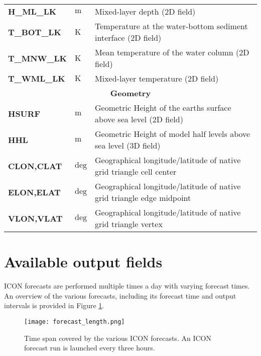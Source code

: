 \begin{longtable}{p{2.5cm}p{1.8cm}p{10.0cm}}
\textbf{H\_ML\_LK}                      &  $\mathrm{m}$               &  Mixed-layer depth (2D field)\\
\textbf{T\_BOT\_LK}                     &  $\mathrm{K}$               &  Temperature at the water-bottom sediment interface (2D field)\\
\textbf{T\_MNW\_LK}                     &  $\mathrm{K}$               &  Mean temperature of the water column (2D field)\\
\textbf{T\_WML\_LK}                     &  $\mathrm{K}$               &  Mixed-layer temperature (2D field)\\
\midrule
\multicolumn{3}{c}{\textbf{Geometry}}\\
\midrule
\textbf{HSURF}                          &  $\mathrm{m}$               &  Geometric Height of the earths surface above sea level (2D field) \\
\textbf{HHL}                            &  $\mathrm{m}$               &  Geometric Height of model half levels above sea level (3D field) \\
\textbf{CLON,CLAT}                      &  $\mathrm{deg}$             &  Geographical longitude/latitude of native grid triangle cell center \\
\textbf{ELON,ELAT}                      &  $\mathrm{deg}$             &  Geographical longitude/latitude of native grid triangle edge midpoint \\
\textbf{VLON,VLAT}                      &  $\mathrm{deg}$             &  Geographical longitude/latitude of native grid triangle vertex \\
  \bottomrule
\end{longtable}





\section{Available output fields}\label{sec_outfields}

ICON forecasts are performed multiple times a day with varying forecast times. An overview of the various forecasts, including its  
forecast time and output intervals is provided in Figure \ref{fig:forecast_length}.
\begin{figure}[hbt]
 \centering
 \texttt{[image: forecast\_length.png]}
 \caption{Time span covered by the various ICON forecasts. An ICON forecast run is launched every three hours.}\label{fig:forecast_length}
\end{figure}

